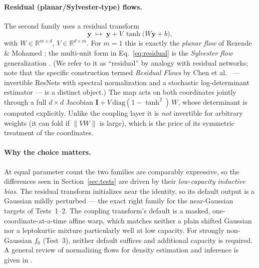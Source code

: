 \documentclass[11pt]{article}
\newcommand{\ffo}{f_{0}}
\begin{document}
\paragraph{Residual (planar/Sylvester-type) flows.}
The second family uses a residual transform
%
\begin{equation}
\mathbf{y} \;\mapsto\; \mathbf{y} + V\,\tanh\!\big(W\mathbf{y} + b\big),
\label{eq:residual}
\end{equation}
%
with $W\in\mathbb{R}^{m\times d}$, $V\in\mathbb{R}^{d\times m}$. For $m=1$
this is exactly the \emph{planar flow} of Rezende \& Mohamed
\cite{rezende2015}; the multi-unit form in Eq.~\eqref{eq:residual} is the
\emph{Sylvester flow} generalization \cite{vandenberg2018}. (We refer to it
as ``residual'' by analogy with residual networks; note that the specific
construction termed \emph{Residual Flows} by Chen et al.\ \cite{chen2019}
--- invertible ResNets with spectral normalization and a stochastic
log-determinant estimator --- is a distinct object.) The map acts on both
coordinates jointly through a full $d\times d$ Jacobian
$\mathbf{I} + V\,\mathrm{diag}(1-\tanh^{2})\,W$, whose determinant is
computed explicitly. Unlike the coupling layer it is \emph{not} invertible
for arbitrary weights (it can fold if $\|VW\|$ is large), which is the price
of its symmetric treatment of the coordinates.

\paragraph{Why the choice matters.}
At equal parameter count the two families are comparably expressive, so the
differences seen in Section~\ref{sec:tests} are driven by their
\emph{low-capacity inductive bias}. The residual transform initializes near
the identity, so its default output is a Gaussian mildly perturbed --- the
exact right family for the near-Gaussian targets of Tests~1--2. The coupling
transform's default is a masked, one-coordinate-at-a-time affine warp, which
matches neither a plain shifted Gaussian nor a leptokurtic mixture
particularly well at low capacity. For strongly non-Gaussian $\ffo$
(Test~3), neither default suffices and additional capacity is required. A
general review of normalizing flows for density estimation and inference is
given in \cite{papamakarios2021}.
\end{document}
